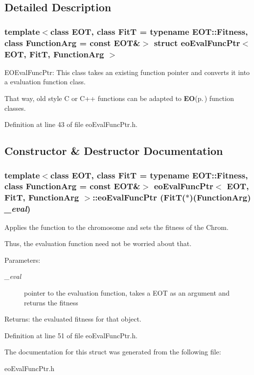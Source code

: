 \subsection{Detailed Description}
\subsubsection*{template$<$class EOT, class Fit\-T = typename EOT::Fitness, class Function\-Arg = const EOT\&$>$ struct eo\-Eval\-Func\-Ptr$<$ EOT, Fit\-T, Function\-Arg $>$}

EOEval\-Func\-Ptr: This class takes an existing function pointer and converts it into a evaluation function class. 

That way, old style C or C++ functions can be adapted to {\bf EO}{\rm (p.\,\pageref{class_e_o})} function classes. 



Definition at line 43 of file eo\-Eval\-Func\-Ptr.h.

\subsection{Constructor \& Destructor Documentation}
\subsubsection{\setlength{\rightskip}{0pt plus 5cm}template$<$class EOT, class Fit\-T = typename EOT::Fitness, class Function\-Arg = const EOT\&$>$ {\bf eo\-Eval\-Func\-Ptr}$<$ {\bf EOT}, {\bf Fit\-T}, Function\-Arg $>$::{\bf eo\-Eval\-Func\-Ptr} ({\bf Fit\-T}($\ast$)(Function\-Arg) {\em \_\-eval})\hspace{0.3cm}{\tt  [inline]}}\label{structeo_eval_func_ptr_a0}


Applies the function to the chromosome and sets the fitness of the Chrom. 

Thus, the evaluation function need not be worried about that. \begin{Desc}
\item[Parameters:]
\begin{description}
\item[{\em \_\-eval}]pointer to the evaluation function, takes a EOT as an argument and returns the fitness \end{description}
\end{Desc}
\begin{Desc}
\item[Returns:]the evaluated fitness for that object. \end{Desc}


Definition at line 51 of file eo\-Eval\-Func\-Ptr.h.

The documentation for this struct was generated from the following file:\begin{CompactItemize}
\item 
eo\-Eval\-Func\-Ptr.h\end{CompactItemize}
